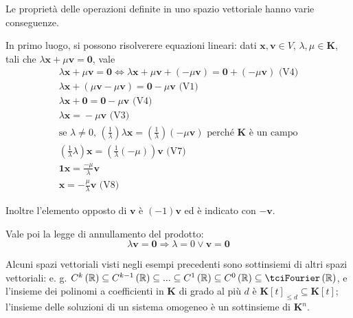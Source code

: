 \documentclass{article}
\begin{document}
Le propriet\`{a} delle operazioni definite in uno spazio vettoriale hanno
varie conseguenze.

In primo luogo, si possono risolverere equazioni lineari: dati $\mathbf{x,v}%
\in V$, $\lambda ,\mu \in \mathbf{K}$, tali che $\lambda \mathbf{x}+\mu 
\mathbf{v}=\mathbf{0}$, vale%
\begin{gather*}
\lambda \mathbf{x}+\mu \mathbf{v}=\mathbf{0}\Longleftrightarrow \lambda 
\mathbf{x}+\mu \mathbf{v+}\left( -\mu \mathbf{v}\right) =\mathbf{0+}\left(
-\mu \mathbf{v}\right) \text{ (V4)} \\
\lambda \mathbf{x}+\left( \mu \mathbf{v}-\mu \mathbf{v}\right) =\mathbf{0}%
-\mu \mathbf{v}\text{ (V1)} \\
\lambda \mathbf{x+0}=\mathbf{0}-\mu \mathbf{v}\text{ (V4)} \\
\lambda \mathbf{x}\mathbf{=}-\mu \mathbf{v}\text{ (V3)} \\
\text{se }\lambda \neq 0\text{, }\left( \frac{1}{\lambda }\right) \lambda 
\mathbf{x}=\left( \frac{1}{\lambda }\right) \left( -\mu \mathbf{v}\right) 
\text{ perch\'{e} }\mathbf{K}\text{ \`{e} un campo} \\
\left( \frac{1}{\lambda }\lambda \right) \mathbf{x}=\left( \frac{1}{\lambda }%
\left( -\mu \right) \right) \mathbf{v}\text{ (V7)} \\
\mathbf{1x}\mathbf{=}\frac{-\mu }{\lambda }\mathbf{v} \\
\mathbf{x}=-\frac{\mu }{\lambda }\mathbf{v}\text{ (V8)}
\end{gather*}

Inoltre l'elemento opposto di $\mathbf{v}$ \`{e} $\left( -1\right) \mathbf{v}
$ ed \`{e} indicato con $-\mathbf{v}$.

Vale poi la legge di annullamento del prodotto:%
\begin{equation*}
\lambda \mathbf{v}=\mathbf{0}\Longrightarrow \lambda =0\vee \mathbf{v}=%
\mathbf{0}
\end{equation*}

Alcuni spazi vettoriali visti negli esempi precedenti sono sottinsiemi di
altri spazi vettoriali: e. g. $C^{k}\left( 
\mathbb{R}
\right) \subseteq C^{k-1}\left( 
\mathbb{R}
\right) \subseteq ...\subseteq C^{1}\left( 
\mathbb{R}
\right) \subseteq C^{0}\left( 
\mathbb{R}
\right) \subseteq \tciFourier \left( 
\mathbb{R}
\right) $, e l'insieme dei polinomi a coefficienti in $\mathbf{K}$ di grado
al pi\`{u} $d$ \`{e} $\mathbf{K}\left[ t\right] _{\leq d}\subseteq \mathbf{K}%
\left[ t\right] $; l'insieme delle soluzioni di un sistema omogeneo \`{e} un
sottinsieme di $\mathbf{K}^{n}$.
\end{document}
